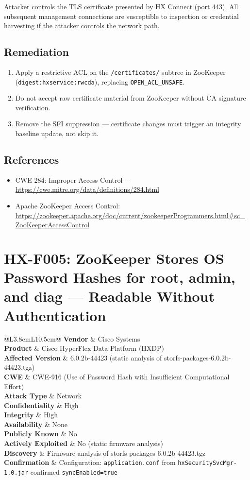 \documentclass[11pt,a4paper]{article}
\makeatletter
\newcommand{\findingmeta}[9]{%
\begin{tabular}{@{}L{3.8cm}L{10.5cm}@{}}
\textbf{Vendor}             & Cisco Systems \\
\textbf{Product}            & Cisco HyperFlex Data Platform (HXDP) \\
\textbf{Affected Version}   & 6.0.2b-44423 (static analysis of storfs-packages-6.0.2b-44423.tgz) \\
\textbf{CWE}                & #1 \\
\textbf{Attack Type}        & #2 \\
\textbf{Confidentiality}    & #3 \\
\textbf{Integrity}          & #4 \\
\textbf{Availability}       & #5 \\
\textbf{Publicly Known}     & #6 \\
\textbf{Actively Exploited} & #7 \\
\textbf{Discovery}          & #8 \\
\textbf{Confirmation}       & #9 \\
\end{tabular}%
}
\makeatother
\begin{document}
Attacker controls the TLS certificate presented by HX Connect (port 443).
All subsequent management connections are susceptible to inspection or
credential harvesting if the attacker controls the network path.

\subsection*{Remediation}

\begin{enumerate}[noitemsep]
\item Apply a restrictive ACL on the \texttt{/certificates/} subtree in
  ZooKeeper (\texttt{digest:hxservice:rwcda}), replacing
  \texttt{OPEN\_ACL\_UNSAFE}.
\item Do not accept raw certificate material from ZooKeeper without CA
  signature verification.
\item Remove the SFI suppression --- certificate changes must trigger an
  integrity baseline update, not skip it.
\end{enumerate}

\subsection*{References}

\begin{itemize}[noitemsep]
\item CWE-284: Improper Access Control ---
  \url{https://cwe.mitre.org/data/definitions/284.html}
\item Apache ZooKeeper Access Control:
  \url{https://zookeeper.apache.org/doc/current/zookeeperProgrammers.html#sc_ZooKeeperAccessControl}
\end{itemize}

\bigskip

\section{HX-F005: ZooKeeper Stores OS Password Hashes for root, admin, and diag --- Readable Without Authentication}

\findingmeta{CWE-916 (Use of Password Hash with Insufficient Computational Effort)}{Network}{High}{High}{None}{No}{No (static firmware analysis)}{Firmware analysis of storfs-packages-6.0.2b-44423.tgz}{Configuration: \texttt{application.conf} from \texttt{hxSecuritySvcMgr-1.0.jar} confirmed \texttt{syncEnabled=true}}
\end{document}
